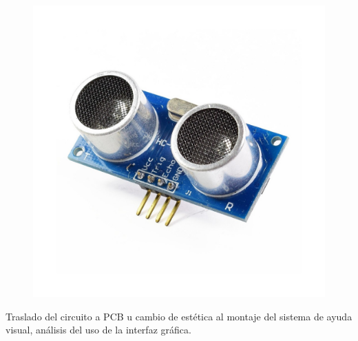 \documentclass[osajnl,twocolumn,showpacs,superscriptaddress,10pt]{revtex4-1}
\begin{document}
\begin{figure}[H]
\begin{center}
    \includegraphics[scale=0.15]{images/sensor-ultrasonido-hc-sr04.jpg}
    \end{center}
\end{figure}


Traslado del circuito a PCB u cambio de estética al montaje del sistema de ayuda visual, análisis del uso de la interfaz gráfica.
\end{document}
